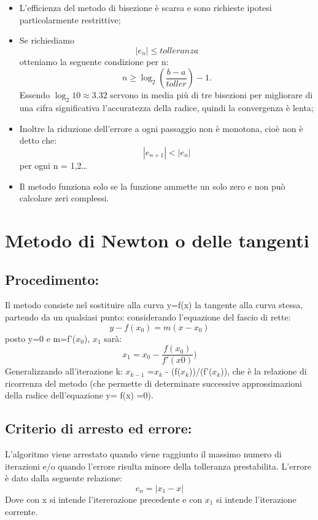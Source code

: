 \documentclass[a4paper,12pt,]{article}
\begin{document}
\begin {itemize}
\item L'efficienza del metodo di bisezione è scarsa e sono richieste ipotesi particolarmente restrittive;
\item Se richiediamo \begin {equation}|e_n| \le tolleranza  \end {equation}otteniamo la seguente condizione per n:
\begin{equation}	n \ge \log_2 (\frac{b-a} {toller}) - 1. \end{equation}
Essendo $ \log_2 10 \approx 3.32$
servono in media più di tre bisezioni per migliorare di una cifra significativa l'accuratezza della radice, quindi la convergenza è  lenta;
\item Inoltre la riduzione dell'errore a ogni passaggio non è monotona, cioè non è detto che:  \begin {equation}|e_{n+1}| < |e_n | \end{equation}per ogni n = 1,2\dots
\item Il metodo funziona solo se la funzione ammette un solo zero e non può calcolare zeri complessi.
\end{itemize}
\section {Metodo di Newton o delle tangenti}		
\subsection{Procedimento:}
Il metodo consiste nel sostituire alla curva  y=f(x)  la tangente alla curva stessa, partendo da un qualsiasi punto: considerando l’equazione del fascio di rette:
\begin{equation} y - f(x_0)=m(x-x_0)\end{equation} posto y=0 e m=f'($x_0$), $x_1$ sarà:\begin{equation} x_1=x_0-\frac {f(x_0)}{f'(x0)}) \end{equation}
Generalizzando all’iterazione   k: $x_{k-1}$ =$x_k$ - (f($x_k$))/(f'($x_k$)), che è la relazione di ricorrenza del metodo (che permette di determinare successive 	approssimazioni della radice dell'equazione y= f(x) =0).
\subsection{Criterio di arresto ed errore:}
L'algoritmo viene arrestato quando viene raggiunto il massimo numero di iterazioni e/o quando l'errore risulta minore della tolleranza prestabilita.
L'errore è dato dalla seguente relazione:
\begin{equation} e_n=|x_1-x| \end{equation}
Dove con x si intende l'itererazione precedente e con $x_1$ si intende l'iterazione corrente.
\end{document}
